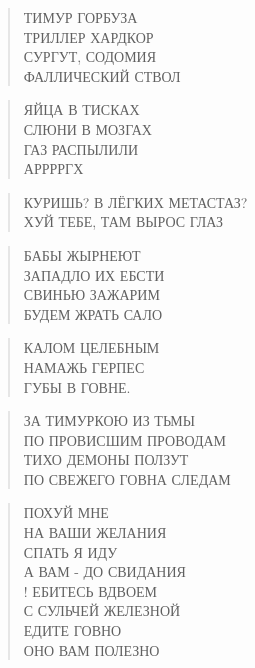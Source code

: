 \poemtitle{***}
\begin{verse}
ТИМУР ГОРБУЗА \\
ТРИЛЛЕР ХАРДКОР\\
СУРГУТ, СОДОМИЯ\\
ФАЛЛИЧЕСКИЙ СТВОЛ
\end{verse}

\poemtitle{***}
\begin{verse}
ЯЙЦА В ТИСКАХ\\
СЛЮНИ В МОЗГАХ\\
ГАЗ РАСПЫЛИЛИ\\
АРРРРГХ
\end{verse}

\poemtitle{***}
\begin{verse}
КУРИШЬ? В ЛЁГКИХ МЕТАСТАЗ?\\
ХУ⁠Й ТЕБЕ, ТАМ ВЫРОС ГЛАЗ
\end{verse}

\poemtitle{***}
\begin{verse}
БАБЫ ЖЫРНЕЮТ\\
ЗАПАДЛО ИХ ЕБСТИ\\
СВИНЬЮ ЗАЖАРИМ\\
БУДЕМ ЖРАТЬ САЛО
\end{verse}

\poemtitle{***}
\begin{verse}
КАЛОМ ЦЕЛЕБНЫМ\\
НАМАЖЬ ГЕРПЕС\\
ГУБЫ В ГОВНЕ.
\end{verse}

\poemtitle{***}
\begin{verse}
ЗА ТИМУРКОЮ ИЗ ТЬМЫ\\
ПО ПРОВИСШИМ ПРОВОДАМ\\
ТИХО ДЕМОНЫ ПОЛЗУТ\\
ПО СВЕЖЕГО ГОВНА СЛЕДАМ
\end{verse}

\poemtitle{***}
\begin{verse}
ПОХУЙ МНЕ\\
НА ВАШИ ЖЕЛАНИЯ\\
СПАТЬ Я ИДУ\\
А ВАМ - ДО СВИДАНИЯ\\!
ЕБИТЕСЬ ВДВОЕМ\\
С СУЛЬЧЕЙ ЖЕЛЕЗНОЙ\\
ЕДИТЕ ГОВНО\\
ОНО ВАМ ПОЛЕЗНО
\end{verse}

